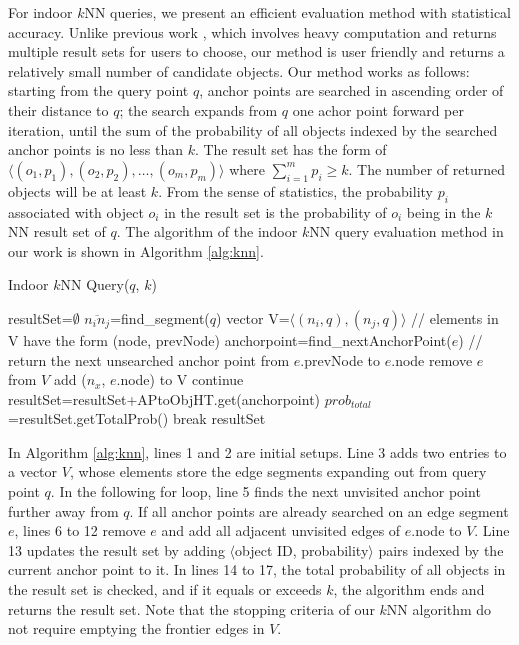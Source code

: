 \documentclass[12pt]{report}
\begin{document}
For indoor \(k\)NN queries, we present an efficient evaluation
method with statistical accuracy.  Unlike previous work
\cite{yang2010-probabilistic,cheng2009-evaluating}, which involves
heavy computation and returns multiple result sets for users to
choose, our method is user friendly and returns a relatively small
number of candidate objects.  Our method works as follows:
starting from the query point \(q\), anchor points are searched in
ascending order of their distance to \(q\); the search expands
from \(q\) one achor point forward per iteration, until the sum of
the probability of all objects indexed by the searched anchor
points is no less than \(k\).  The result set has the form of
\(\langle(o_1, p_1), (o_2, p_2), \ldots, (o_m, p_m)\rangle\) where
\(\sum_{i=1}^{m} p_i \geq k\).  The number of returned objects
will be at least \(k\).  From the sense of statistics, the
probability \(p_i\) associated with object \(o_i\) in the result
set is the probability of \(o_i\) being in the \(k\)NN result set
of \(q\).  The algorithm of the indoor \(k\)NN query evaluation
method in our work is shown in Algorithm \ref{alg:knn}.
\begin{algorithm}[!t]
  \caption{Indoor \(k\)NN Query(\(q\), \(k\))}
  \label{alg:knn}
  \small
  \begin{algorithmic}[1]
    \STATE resultSet=\(\emptyset\)
    \STATE \(\overline{n_in_j}\)=find\_segment(\(q\))
    \STATE vector V=\(\langle(n_i,q), (n_j,q)\rangle\)  // elements in V have the form (node, prevNode) 
    \STATE anchorpoint=find\_nextAnchorPoint(\(e\)) // return the next unsearched anchor point from \(e\).prevNode to \(e\).node
    \STATE remove \(e\) from \(V\)
    \STATE add (\(n_x\), \(e\).node) to V
    \ENDFOR
    \STATE continue
    \ENDIF
    \STATE resultSet=resultSet+APtoObjHT.get(anchorpoint)
    \STATE \(prob_{total}\)=resultSet.getTotalProb() %
    \STATE break
    \ENDIF
    \ENDFOR \RETURN resultSet
  \end{algorithmic}
\end{algorithm}

In Algorithm \ref{alg:knn}, lines 1 and 2 are initial setups.  Line
3 adds two entries to a vector \(V\), whose elements store the
edge segments expanding out from query point \(q\).  In the
following for loop, line 5 finds the next unvisited anchor point
further away from \(q\).  If all anchor points are already
searched on an edge segment \(e\), lines 6 to 12 remove \(e\) and
add all adjacent unvisited edges of \(e\).node to \(V\).  Line 13
updates the result set by adding \(\langle\)object ID,
probability\(\rangle\) pairs indexed by the current anchor point
to it.  In lines 14 to 17, the total probability of all objects in
the result set is checked, and if it equals or exceeds \(k\), the
algorithm ends and returns the result set.  Note that the stopping
criteria of our \(k\)NN algorithm do not require emptying the
frontier edges in \(V\).
\end{document}
